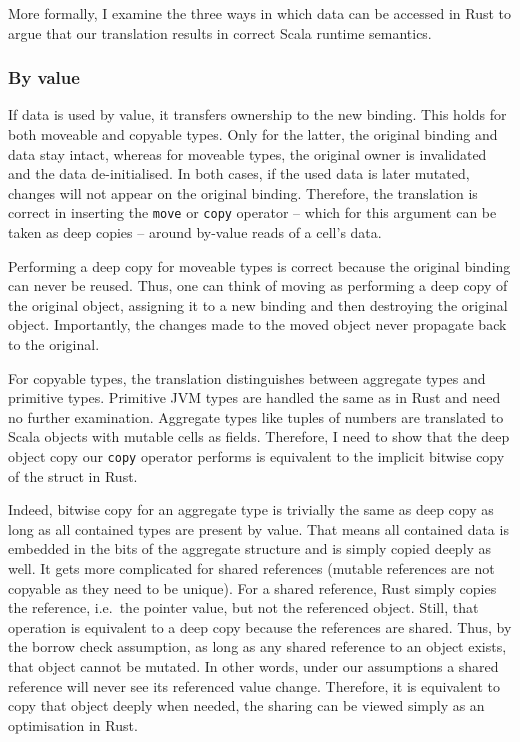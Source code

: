 More formally, I examine the three ways in which data can be accessed in Rust to
argue that our translation results in correct Scala runtime semantics.

\subsubsection{By value}
\label{sec:correctness-by-value}

If data is used by value, it transfers ownership to the new binding. This holds
for both moveable and copyable types. Only for the latter, the original binding
and data stay intact, whereas for moveable types, the original owner is
invalidated and the data de-initialised. In both cases, if the used data is
later mutated, changes will not appear on the original binding. Therefore, the
translation is correct in inserting the \lstinline!move! or \lstinline!copy!
operator -- which for this argument can be taken as deep copies -- around
by-value reads of a cell's data.

Performing a deep copy for moveable types is correct because the original
binding can never be reused. Thus, one can think of moving as performing a deep
copy of the original object, assigning it to a new binding and then destroying
the original object. Importantly, the changes made to the moved object never
propagate back to the original.

For copyable types, the translation distinguishes between aggregate types and
primitive types. Primitive JVM types are handled the same as in Rust and need no
further examination. Aggregate types like tuples of numbers are translated to
Scala objects with mutable cells as fields. Therefore, I need to show that the
deep object copy our \lstinline!copy! operator performs is equivalent to the
implicit bitwise copy of the struct in Rust.

Indeed, bitwise copy for an aggregate type is trivially the same as deep copy as
long as all contained types are present by value. That means all contained data
is embedded in the bits of the aggregate structure and is simply copied deeply
as well. It gets more complicated for shared references (mutable references are
not copyable as they need to be unique). For a shared reference, Rust simply
copies the reference, i.e.~the pointer value, but not the referenced object.
Still, that operation is equivalent to a deep copy because the references are
shared. Thus, by the borrow check assumption, as long as any shared reference to
an object exists, that object cannot be mutated. In other words, under our
assumptions a shared reference will never see its referenced value change.
Therefore, it is equivalent to copy that object deeply when needed, the sharing
can be viewed simply as an optimisation in Rust.

